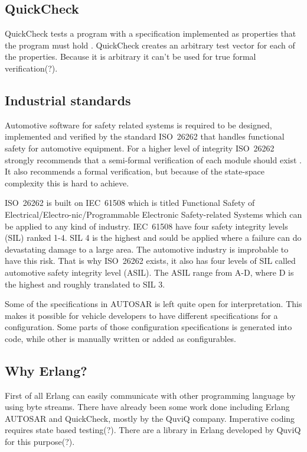 \documentclass[11pt,a4paper]{report}
\begin{document}
\subsection{QuickCheck}
QuickCheck tests a program with a specification implemented as properties that
the program must hold \cite{QUICKCHECK:manual}. QuickCheck creates an arbitrary
test vector for each of the properties. Because it is arbitrary it can't be used
for true formal verification(?).

\subsection{Industrial standards}
Automotive software for safety related systems is required to be designed,
implemented and verified by the standard ISO~26262 that handles functional
safety for automotive equipment.
For a higher level of integrity ISO~26262 strongly recommends that a semi-formal
verification of each module should exist \cite[Table 9, part 6, p. 26]{ISO26262}.
It also recommends a formal verification, but because of the state-space
complexity this is hard to achieve.

ISO~26262 is built on IEC~61508 which is titled Functional Safety of
Electrical/Electro-nic/Programmable Electronic Safety-related Systems which can
be applied to any kind of industry. IEC~61508 have four safety integrity levels
(SIL) ranked 1-4. SIL 4 is the highest and sould be applied where a failure can
do devastating damage to a large area. The automotive industry is improbable to
have this risk. That is why ISO~26262 exists, it also has four levels of SIL
called automotive safety integrity level (ASIL). The ASIL range from A-D, where
D is the highest and roughly translated to SIL 3.

Some of the specifications in AUTOSAR is left quite open for interpretation.
This makes it possible for vehicle developers to have different specifications
for a configuration. Some parts of those configuration specifications is
generated into code, while other is manually written or added as configurables.

\subsection{Why Erlang?}
First of all Erlang can easily communicate with other programming language by
using byte streams. There have already been some work done including Erlang
AUTOSAR and QuickCheck, mostly by the QuviQ company\cite{QUVIQ:flyer}.
Imperative coding requires state based testing(?). There are a library in
Erlang developed by QuviQ for this purpose(?).
\end{document}
